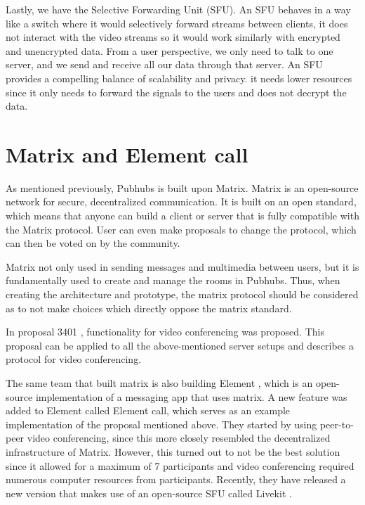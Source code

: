 \documentclass{report}
\begin{document}
Lastly, we have the Selective Forwarding Unit (SFU). An SFU behaves in a way like a switch where it would
selectively forward streams between clients, it does not interact with the video streams so it would work similarly
with encrypted and unencrypted data. From a user perspective, we only need to talk to one server, and we send and
receive all our data through that server. An SFU provides a compelling balance of scalability and privacy. it needs
lower resources since it only needs to forward the signals to the users and does not decrypt the data.


\section{Matrix and Element call}
As mentioned previously, Pubhubs is built upon Matrix. Matrix is an open-source network for secure, decentralized
communication. It is built on an open standard, which means that anyone can build a client or server that is fully
compatible with the Matrix protocol. User can even make proposals to change the protocol, which can then be voted on
by the community. 

Matrix not only used in sending messages and
multimedia between users, but it is fundamentally used to create and manage the rooms in Pubhubs. Thus, when
creating the architecture and prototype, the matrix protocol should be considered as to not make choices which
directly oppose the matrix standard.

In proposal 3401 \cite{MATRIX_VIDEO_CALL_PROP}, functionality for video conferencing was proposed.
This proposal can be applied to all the above-mentioned server setups and describes a protocol for video conferencing.

The same team that built matrix is also building Element \cite{ELEMENT}
, which is an open-source implementation of a messaging app that uses matrix. A new feature was added to Element
called Element call, which serves as an example implementation of the proposal mentioned above. They started by
using peer-to-peer video conferencing, since this more closely resembled the decentralized infrastructure of Matrix.
However, this turned out to not be the best solution since it allowed for a maximum of 7 participants and video
conferencing required numerous computer resources from participants. Recently, they have released a new version that
makes use of an open-source SFU called Livekit \cite{LIVEKIT}.
\end{document}
